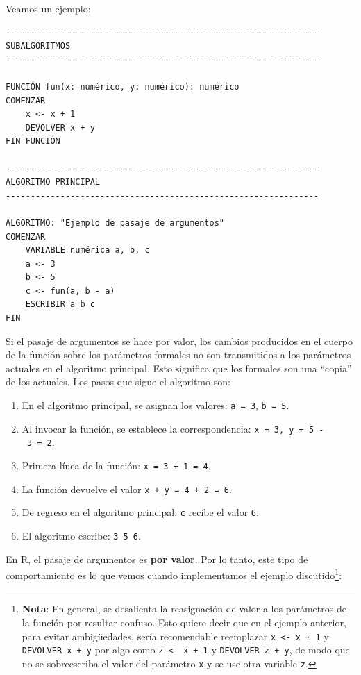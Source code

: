 \documentclass[
]{book}
\providecommand{\tightlist}{%
  \setlength{\itemsep}{0pt}\setlength{\parskip}{0pt}}
\begin{document}
Veamos un ejemplo:

\begin{verbatim}
---------------------------------------------------------------
SUBALGORITMOS
---------------------------------------------------------------

FUNCIÓN fun(x: numérico, y: numérico): numérico
COMENZAR
    x <- x + 1
    DEVOLVER x + y
FIN FUNCIÓN

---------------------------------------------------------------
ALGORITMO PRINCIPAL
---------------------------------------------------------------

ALGORITMO: "Ejemplo de pasaje de argumentos"
COMENZAR
    VARIABLE numérica a, b, c
    a <- 3
    b <- 5
    c <- fun(a, b - a)
    ESCRIBIR a b c
FIN
\end{verbatim}

Si el pasaje de argumentos se hace por valor, los cambios producidos en el cuerpo de la función sobre los parámetros formales no son transmitidos a los parámetros actuales en el algoritmo principal. Esto significa que los formales son una ``copia'' de los actuales. Los pasos que sigue el algoritmo son:

\begin{enumerate}
\def\labelenumi{\arabic{enumi}.}
\tightlist
\item
  En el algoritmo principal, se asignan los valores: \texttt{a\ =\ 3}, \texttt{b\ =\ 5}.
\item
  Al invocar la función, se establece la correspondencia: \texttt{x\ =\ 3,\ y\ =\ 5\ -\ 3\ =\ 2}.
\item
  Primera línea de la función: \texttt{x\ =\ 3\ +\ 1\ =\ 4}.
\item
  La función devuelve el valor \texttt{x\ +\ y\ =\ 4\ +\ 2\ =\ 6}.
\item
  De regreso en el algoritmo principal: \texttt{c} recibe el valor \texttt{6}.
\item
  El algoritmo escribe: \texttt{3\ 5\ 6}.
\end{enumerate}

En R, el pasaje de argumentos es \textbf{por valor}. Por lo tanto, este tipo de comportamiento es lo que vemos cuando implementamos el ejemplo discutido\footnote{\textbf{Nota}: En general, se desalienta la reasignación de valor a los parámetros de la función por resultar confuso. Esto quiere decir que en el ejemplo anterior, para evitar ambigüedades, sería recomendable reemplazar \texttt{x\ \textless{}-\ x\ +\ 1} y \texttt{DEVOLVER\ x\ +\ y} por algo como \texttt{z\ \textless{}-\ x\ +\ 1} y \texttt{DEVOLVER\ z\ +\ y}, de modo que no se sobreescriba el valor del parámetro \texttt{x} y se use otra variable \texttt{z}.}:
\end{document}
